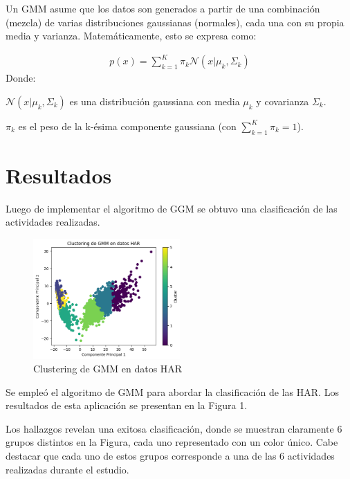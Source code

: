 \documentclass{esannV2}
\begin{document}
Un GMM asume que los datos son generados a partir de una combinación (mezcla) de varias distribuciones gaussianas (normales), cada una con su propia media y varianza. Matemáticamente, esto se expresa como:

\begin{eqnarray}
p(x) = \sum_{k=1}^{K} \pi_{k} \mathcal{N}(x | \mu_{k}, \Sigma_{k})
\end{eqnarray}
Donde:

$\mathcal{N}(x | \mu_{k}, \Sigma_{k})$ es una distribución gaussiana con media $\mu_{k}$ y covarianza $\Sigma_{k}$.


$\pi_{k}$ es el peso de la k-ésima componente gaussiana (con $\sum_{k=1}^{K} \pi_{k} = 1$).


\section{Resultados}
Luego de implementar el algoritmo de GGM se obtuvo una clasificación de las actividades realizadas.
\begin{figure}[ht!]
\centering
\includegraphics[width=0.5\textwidth]{figs/Resultados.png}
\caption{Clustering de GMM en datos HAR}\label{Fig:resultados}
\end{figure}
Se empleó el algoritmo de GMM para abordar la clasificación de las HAR. Los resultados de esta aplicación se presentan en la Figura 1.

Los hallazgos revelan una exitosa clasificación, donde se muestran claramente 6 grupos distintos en la Figura, cada uno representado con un color único. Cabe destacar que cada uno de estos grupos corresponde a una de las 6 actividades realizadas durante el estudio.
\end{document}
